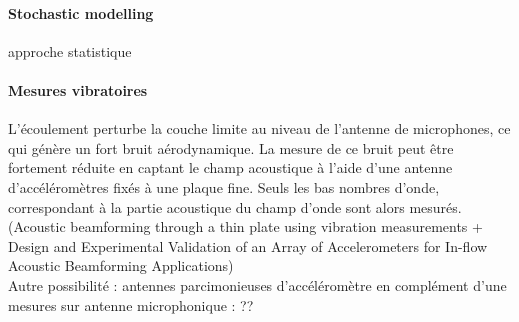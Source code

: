 






\paragraph{Stochastic modelling}
approche statistique


\paragraph{Mesures vibratoires}

L'écoulement perturbe la couche limite au niveau de l'antenne de microphones, ce qui génère un fort bruit aérodynamique. La mesure de ce bruit peut être fortement réduite en captant le champ acoustique à l'aide d'une antenne d'accéléromètres fixés à une plaque fine. Seuls les bas nombres d'onde, correspondant à la partie acoustique du champ d'onde sont alors mesurés. (Acoustic beamforming through a thin plate using vibration measurements  +   Design and Experimental Validation of an Array of Accelerometers for In-flow Acoustic Beamforming Applications) \\


Autre possibilité : antennes parcimonieuses d'accéléromètre en complément d'une mesures sur antenne microphonique : ??



